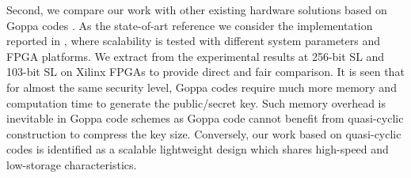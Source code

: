 \documentclass[runningheads]{llncs}
\begin{document}
\begin{table}[!t]\centering
\caption{Performance comparison of our FPGA implementation with other code-based key generators.}
\label{table:compare}
\begin{minipage}{\textwidth}\centering
{}
\end{minipage}
\end{table}

Second, we compare our work with other existing hardware solutions based on Goppa codes \cite{wang2018fpga,shoufan2010novel}. As the state-of-art reference we consider the implementation reported in \cite{wang2018fpga}, where scalability is tested with different system parameters and FPGA platforms. We extract from \cite{wang2018fpga} the experimental results at 256-bit SL and 103-bit SL on Xilinx FPGAs to provide direct and fair comparison.
It is seen that for almost the same security level, Goppa codes require much more memory and computation time to generate the public/secret key. Such memory overhead is inevitable in Goppa code schemes as Goppa code cannot benefit from quasi-cyclic construction to compress the key size.
Conversely, our work based on quasi-cyclic codes is identified as a scalable lightweight design which shares high-speed and low-storage characteristics.
\end{document}
